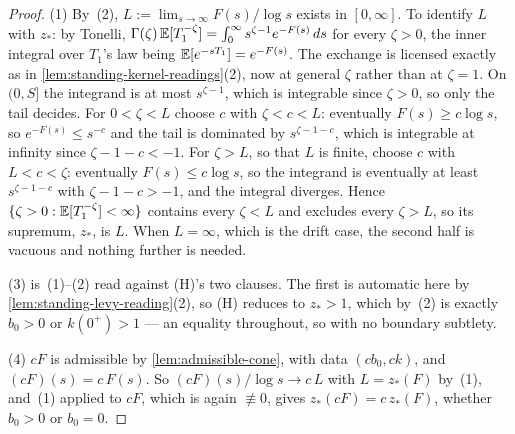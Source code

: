 \begin{proof}
(1) By~(2), $L := \lim_{s\to\infty} F(s)/\log s$ exists in $[0,\infty]$. To identify $L$ with
$z_*$: by Tonelli, $\Gamma(\zeta)\,\mathbb{E}[T_1^{-\zeta}] = \int_0^\infty s^{\zeta-1}e^{-F(s)}\,ds$ for
every $\zeta > 0$, the inner integral over $T_1$'s law being $\mathbb{E}[e^{-sT_1}] = e^{-F(s)}$. The
exchange is licensed exactly as in \ref{lem:standing-kernel-readings}(2), now at general $\zeta$
rather than at $\zeta = 1$. On $(0,S]$ the integrand is at most $s^{\zeta-1}$, which is integrable
since $\zeta > 0$, so only the tail decides. For $0 < \zeta < L$ choose $c$ with $\zeta < c < L$:
eventually $F(s) \ge c\log s$, so $e^{-F(s)} \le s^{-c}$ and the tail is dominated by
$s^{\zeta-1-c}$, which is integrable at infinity since $\zeta - 1 - c < -1$. For $\zeta > L$, so that
$L$ is finite, choose $c$ with $L < c < \zeta$: eventually $F(s) \le c\log s$, so the integrand is
eventually at least $s^{\zeta-1-c}$ with $\zeta - 1 - c > -1$, and the integral diverges. Hence
$\{\zeta > 0 : \mathbb{E}[T_1^{-\zeta}] < \infty\}$ contains every $\zeta < L$ and excludes every
$\zeta > L$, so its supremum, $z_*$, is $L$. When $L = \infty$, which is the drift case, the second
half is vacuous and nothing further is needed.

(3) is~(1)--(2) read against (H)'s two clauses. The first is automatic here by
\ref{lem:standing-levy-reading}(2), so (H) reduces to $z_* > 1$, which by~(2) is exactly
$b_0 > 0$ or $k(0^+) > 1$ --- an equality throughout, so with no boundary subtlety.

(4) $cF$ is admissible by \ref{lem:admissible-cone}, with data $(cb_0, ck)$, and $(cF)(s) = c\,F(s)$.
So $(cF)(s)/\log s \to c\,L$ with $L = z_*(F)$ by~(1), and~(1) applied to $cF$, which is again
$\not\equiv 0$, gives $z_*(cF) = c\,z_*(F)$, whether $b_0 > 0$ or $b_0 = 0$.
\end{proof}

